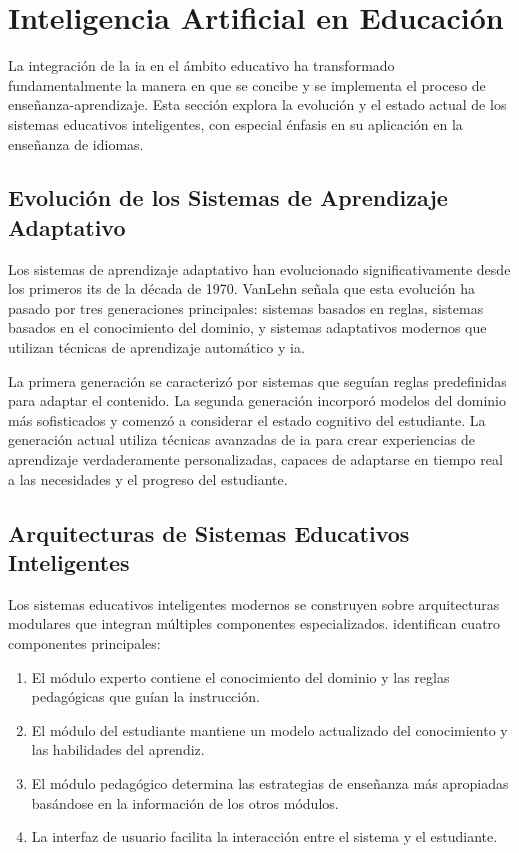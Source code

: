 \section{Inteligencia Artificial en Educación}

La integración de la \gls{ia} en el ámbito educativo ha transformado fundamentalmente la manera en que se concibe y se implementa el proceso de enseñanza-aprendizaje. Esta sección explora la evolución y el estado actual de los sistemas educativos inteligentes, con especial énfasis en su aplicación en la enseñanza de idiomas.

\subsection{Evolución de los Sistemas de Aprendizaje Adaptativo}
Los sistemas de aprendizaje adaptativo han evolucionado significativamente desde los primeros \gls{its} de la década de 1970. VanLehn \cite{vanlehn2011relative} señala que esta evolución ha pasado por tres generaciones principales: sistemas basados en reglas, sistemas basados en el conocimiento del dominio, y sistemas adaptativos modernos que utilizan técnicas de aprendizaje automático y \gls{ia}.

La primera generación se caracterizó por sistemas que seguían reglas predefinidas para adaptar el contenido. La segunda generación incorporó modelos del dominio más sofisticados y comenzó a considerar el estado cognitivo del estudiante. La generación actual utiliza técnicas avanzadas de \gls{ia} para crear experiencias de aprendizaje verdaderamente personalizadas, capaces de adaptarse en tiempo real a las necesidades y el progreso del estudiante.

\subsection{Arquitecturas de Sistemas Educativos Inteligentes}
Los sistemas educativos inteligentes modernos se construyen sobre arquitecturas modulares que integran múltiples componentes especializados. \cite{anderson2020adaptive} identifican cuatro componentes principales:

\begin{enumerate}
  \item El módulo experto contiene el conocimiento del dominio y las reglas pedagógicas que guían la instrucción.
  \item El módulo del estudiante mantiene un modelo actualizado del conocimiento y las habilidades del aprendiz.
  \item El módulo pedagógico determina las estrategias de enseñanza más apropiadas basándose en la información de los otros módulos.
  \item La interfaz de usuario facilita la interacción entre el sistema y el estudiante.
\end{enumerate}

